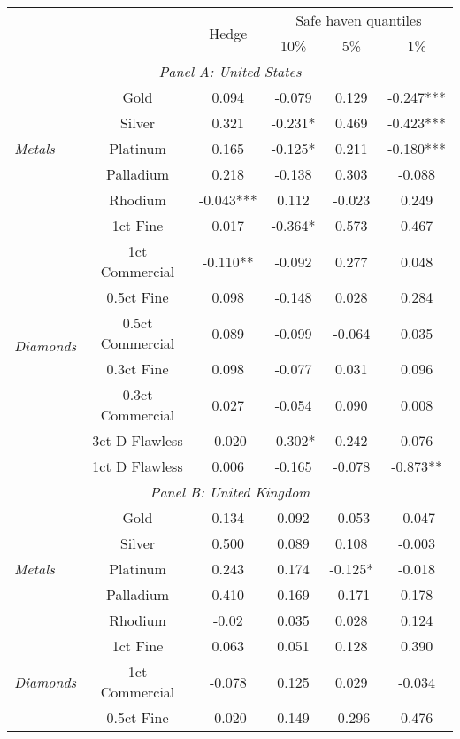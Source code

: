 \begin{tabularx}{1\textwidth}{Xccccc}
\toprule
 &    & \multirow{2}{*}{Hedge}  & \multicolumn{3}{c}{Safe haven quantiles} \\
\cmidrule(l{0.25em}){4-6} 
     &     &     & 10\% & 5\% & 1\% \\
\midrule
\multicolumn{6}{c}{\emph{Panel A: United States}} \\
\multirow{5}{*}{\emph{Metals}} & Gold & 0.094 & -0.079 & 0.129 & -0.247*** \\
								& Silver & 0.321 & -0.231* & 0.469 & -0.423*** \\
								& Platinum & 0.165 & -0.125* & 0.211 & -0.180*** \\
								& Palladium & 0.218 & -0.138 & 0.303 & -0.088 \\
								& Rhodium & -0.043*** & 0.112 & -0.023 & 0.249 \\
\midrule
\multirow{8}{*}{\emph{Diamonds}} & 1ct Fine & 0.017 & -0.364* & 0.573 & 0.467 \\
								& 1ct Commercial & -0.110** & -0.092 & 0.277 & 0.048 \\
								& 0.5ct Fine & 0.098 & -0.148 & 0.028 & 0.284 \\
								& 0.5ct Commercial & 0.089 & -0.099 & -0.064 & 0.035 \\
								& 0.3ct Fine & 0.098 & -0.077 & 0.031 & 0.096 \\
								& 0.3ct Commercial & 0.027 & -0.054 & 0.090 & 0.008 \\
								& 3ct D Flawless & -0.020 & -0.302* & 0.242 & 0.076 \\
								& 1ct D Flawless & 0.006 & -0.165 & -0.078 & -0.873** \\
\midrule
\multicolumn{6}{c}{\emph{Panel B: United Kingdom}} \\
\multirow{5}{*}{\emph{Metals}} & Gold & 0.134 & 0.092 & -0.053 & -0.047 \\
								& Silver & 0.500 & 0.089 & 0.108 & -0.003 \\
								& Platinum & 0.243 & 0.174 & -0.125* & -0.018 \\
								& Palladium & 0.410 & 0.169 & -0.171 & 0.178 \\
								& Rhodium & -0.02 & 0.035 & 0.028 & 0.124 \\
\midrule
\multirow{8}{*}{\emph{Diamonds}} & 1ct Fine & 0.063 & 0.051 & 0.128 & 0.390 \\
								& 1ct Commercial & -0.078 & 0.125 & 0.029 & -0.034 \\
								& 0.5ct Fine & -0.020 & 0.149 & -0.296 & 0.476 \\

\end{tabularx}
